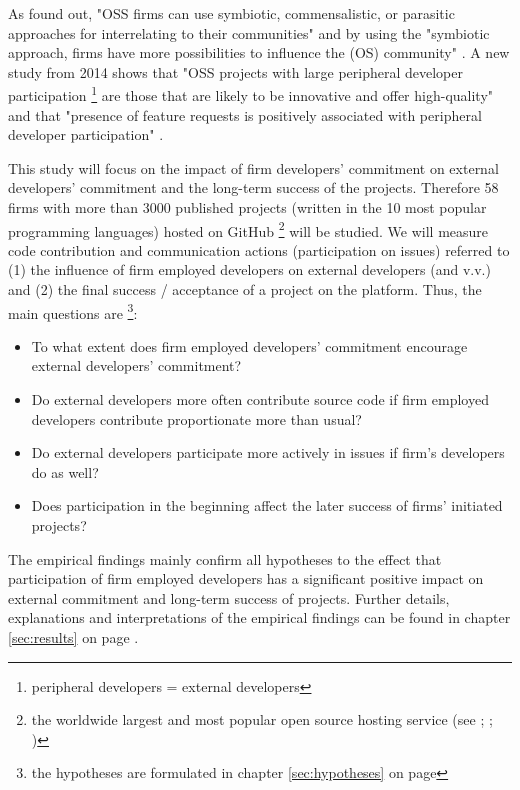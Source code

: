 As \cite{dahlander2005relationships} found out, "OSS firms can use symbiotic, commensalistic, or parasitic approaches for interrelating to their communities" and by using the "symbiotic approach, firms have more possibilities to influence the (OS) community" \cite[p.491-492]{dahlander2005relationships}. A new study from 2014 shows that "OSS projects with large peripheral developer participation \footnote{peripheral developers = external developers} are those that are likely to be innovative and offer high-quality" \cite[p.40:22]{krishnamurthy2016peripheral} and that "presence of feature requests is positively associated with peripheral developer participation" \cite[p.40:23]{krishnamurthy2016peripheral}.

This study will focus on the impact of firm developers' commitment on external developers' commitment and the long-term success of the projects. Therefore 58 firms with more than 3000 published projects (written in the 10 most popular programming languages) hosted on GitHub \footnote{the worldwide largest and most popular open source hosting service (see \cite{GitHubDominatesTheForges:online}; \cite{HowGitHubConqueredGoogleMicrosoftAndEveryoneElse:online}; \cite{AboutGitHubPress:online})} will be studied. We will measure code contribution and communication actions (participation on issues) referred to (1) the influence of firm employed developers on external developers (and v.v.) and (2) the final success / acceptance of a project on the platform. Thus, the main questions are \footnote{the hypotheses are formulated in chapter \ref{sec:hypotheses} on page \pageref{sec:hypotheses}}:

\begin{itemize}
  \item To what extent does firm employed developers' commitment encourage external developers' commitment?
  \item Do external developers more often contribute source code if firm employed developers contribute proportionate more than usual?
  \item Do external developers participate more actively in issues if firm's developers do as well?
  \item Does participation in the beginning affect the later success of firms' initiated projects?
\end{itemize}

The empirical findings mainly confirm all hypotheses to the effect that participation of firm employed developers has a significant positive impact on external commitment and long-term success of projects. Further details, explanations and interpretations of the empirical findings can be found in chapter \ref{sec:results} on page \pageref{sec:results}.
